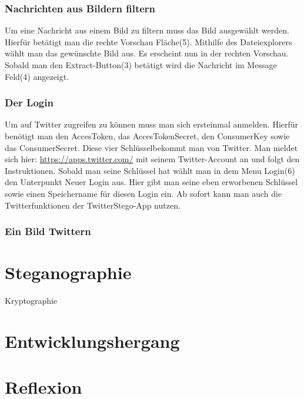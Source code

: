 \documentclass[11pt]{article}
\begin{document}
\newpage

\subsubsection{Nachrichten aus Bildern filtern}
Um eine Nachricht aus einem Bild zu filtern muss das Bild ausgewählt werden. Hierfür betätigt man die rechte Vorschau Fläche(5). Mithilfe des Dateiexplorers wählt man das gewünschte Bild aus. Es erscheint nun in der rechten Vorschau. Sobald man den Extract-Button(3) betätigt wird die Nachricht im Message Feld(4) angezeigt. 

\subsubsection{Der Login}
Um auf Twitter zugreifen zu können muss man sich ersteinmal anmelden. Hierfür benötigt man den AccesToken, das AccesTokenSecret, den ConsumerKey sowie das ConsumerSecret. Diese vier Schlüsselbekommt man von Twitter. Man meldet sich hier: \url{https://apps.twitter.com/} mit seinem Twitter-Account an und folgt den Instruktionen. Sobald man seine Schlüssel hat wählt man in dem Menu Login(6) den Unterpunkt Neuer Login aus. Hier gibt man seine eben erworbenen Schlüssel sowie einen Speichername für diesen Login ein.
Ab sofort kann man auch die Twitterfunktionen der TwitterStego-App nutzen.


\subsubsection{Ein Bild Twittern}






\newpage
\section{Steganographie}

Kryptographie



\newpage
\section{Entwicklungshergang}


\newpage
\section{Reflexion}





\newpage
\renewcommand{\indexname}{Stichwortverzeichnis}


\printindex
\end{document}
